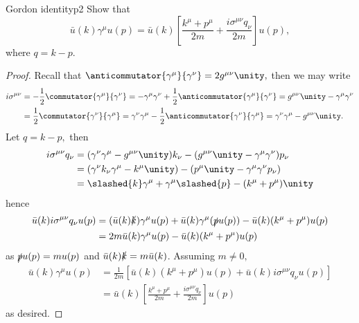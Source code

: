 \begin{problem}{Gordon identity}{p2}
   Show that 
   \begin{equation*}
      \bar{u}(k) \gamma^\mu u(p) = \bar{u}(k) \left[\frac{k^\mu + p^\mu}{2m} + \frac{i \sigma^{\mu \nu} q_\nu}{2m}\right]u(p),
   \end{equation*}
   where \(q = k - p.\)
\end{problem}
\begin{proof}
   Recall that \(\anticommutator{\gamma^\mu}{\gamma^\nu} = 2g^{\mu \nu}\unity,\) then we may write
   \begin{align*}
      i\sigma^{\mu \nu} &= -\frac{1}2 \commutator{\gamma^\mu}{\gamma^\nu} = - \gamma^\mu \gamma^\nu + \frac12\anticommutator{\gamma^\mu}{\gamma^\nu} = g^{\mu \nu}\unity - \gamma^\mu \gamma^\nu\\
                        &= \frac12 \commutator{\gamma^\nu}{\gamma^\mu} = \gamma^\nu \gamma^\mu - \frac12 \anticommutator{\gamma^\nu}{\gamma^\mu} = \gamma^\nu \gamma^\mu - g^{\mu\nu} \unity.
   \end{align*}
   Let \(q = k - p,\) then
   \begin{align*}
      i \sigma^{\mu\nu} q_\nu &=  (\gamma^\nu \gamma^\mu - g^{\mu \nu} \unity)k_\nu -  (g^{\mu \nu}\unity - \gamma^\mu \gamma^\nu)p_\nu\\
                              &= (\gamma^\nu k_\nu \gamma^\mu - k^\mu \unity) - (p^\mu \unity - \gamma^\mu \gamma^\nu p_\nu)\\
                              &= \slashed{k} \gamma^\mu + \gamma^\mu \slashed{p} - (k^\mu + p^\mu)\unity
   \end{align*}
   hence
   \begin{align*}
      \bar{u}(k) i \sigma^{\mu\nu} q_\nu u(p) &= (\bar{u}(k) \slashed{k})\gamma^\mu u(p) + \bar{u}(k) \gamma^\mu (\slashed{p} u(p)) - \bar{u}(k) (k^\mu + p^\mu) u(p)\\
                                              &= 2m \bar{u}(k) \gamma^\mu u(p) - \bar{u}(k) (k^\mu + p^\mu) u(p)
   \end{align*}
   as \(\slashed{p}u(p) = m u(p)\) and \(\bar{u}(k) \slashed{k} = m \bar{u}(k)\). Assuming \(m \neq 0,\)
   \begin{align*}
      \bar{u}(k) \gamma^\mu u(p) &= \frac{1}{2m}\left[\bar{u}(k) (k^\mu + p^\mu) u(p) + \bar{u}(k) i \sigma^{\mu \nu} q_\nu u(p)\right]\\
                                 &= \bar{u}(k) \left[\frac{k^\mu + p^\mu}{2m} + \frac{i \sigma^{\mu \nu} q_\nu}{2m}\right]u(p)
   \end{align*}
   as desired.
\end{proof}
